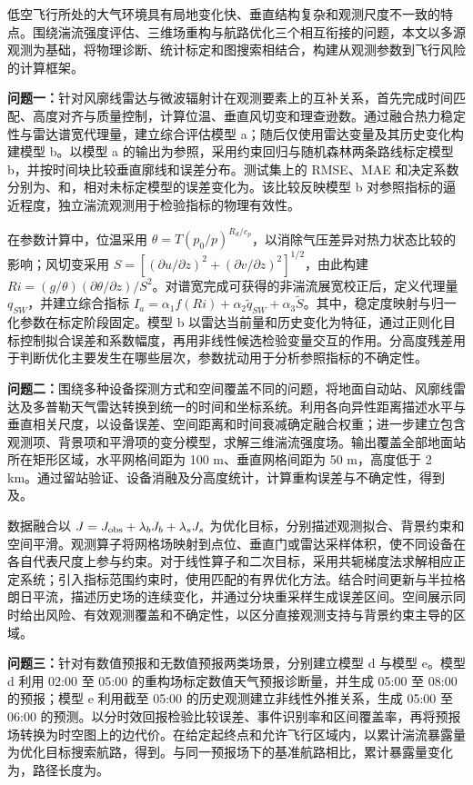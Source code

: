 \indent 低空飞行所处的大气环境具有局地变化快、垂直结构复杂和观测尺度不一致的特点。围绕湍流强度评估、三维场重构与航路优化三个相互衔接的问题，本文以多源观测为基础，将物理诊断、统计标定和图搜索相结合，构建从观测参数到飞行风险的计算框架。

\textbf{问题一：}针对风廓线雷达与微波辐射计在观测要素上的互补关系，首先完成时间匹配、高度对齐与质量控制，计算位温、垂直风切变和理查逊数。通过融合热力稳定性与雷达谱宽代理量，建立综合评估模型 a；随后仅使用雷达变量及其历史变化构建模型 b。以模型 a 的输出为参照，采用约束回归与随机森林两条路线标定模型 b，并按时间块比较垂直廓线和误差分布。测试集上的 RMSE、MAE 和决定系数分别为、和，相对未标定模型的误差变化为。该比较反映模型 b 对参照指标的逼近程度，独立湍流观测用于检验指标的物理有效性。

在参数计算中，位温采用 $\theta=T(p_0/p)^{R_d/c_p}$，以消除气压差异对热力状态比较的影响；风切变采用 $S=[(\partial u/\partial z)^2+(\partial v/\partial z)^2]^{1/2}$，由此构建 $Ri=(g/\theta)(\partial\theta/\partial z)/S^2$。对谱宽完成可获得的非湍流展宽校正后，定义代理量 $q_{SW}$，并建立综合指标 $I_a=\alpha_1f(Ri)+\alpha_2\widetilde q_{SW}+\alpha_3\widetilde S$。其中，稳定度映射与归一化参数在标定阶段固定。模型 b 以雷达当前量和历史变化为特征，通过正则化目标控制拟合误差和系数幅度，再用非线性候选检验变量交互的作用。分高度残差用于判断优化主要发生在哪些层次，参数扰动用于分析参照指标的不确定性。

\textbf{问题二：}围绕多种设备探测方式和空间覆盖不同的问题，将地面自动站、风廓线雷达及多普勒天气雷达转换到统一的时间和坐标系统。利用各向异性距离描述水平与垂直相关尺度，以设备误差、空间距离和时间衰减确定融合权重；进一步建立包含观测项、背景项和平滑项的变分模型，求解三维湍流强度场。输出覆盖全部地面站所在矩形区域，水平网格间距为 100 m、垂直网格间距为 50 m，高度低于 2 km。通过留站验证、设备消融及分高度统计，计算重构误差与不确定性，得到及。

数据融合以 $J=J_{\rm obs}+\lambda_bJ_b+\lambda_sJ_s$ 为优化目标，分别描述观测拟合、背景约束和空间平滑。观测算子将网格场映射到点位、垂直门或雷达采样体积，使不同设备在各自代表尺度上参与约束。对于线性算子和二次目标，采用共轭梯度法求解相应正定系统；引入指标范围约束时，使用匹配的有界优化方法。结合时间更新与半拉格朗日平流，描述历史场的连续变化，并通过分块重采样生成误差区间。空间展示同时给出风险、有效观测覆盖和不确定性，以区分直接观测支持与背景约束主导的区域。

\textbf{问题三：}针对有数值预报和无数值预报两类场景，分别建立模型 d 与模型 e。模型 d 利用 02:00 至 05:00 的重构场标定数值天气预报诊断量，并生成 05:00 至 08:00 的预报；模型 e 利用截至 05:00 的历史观测建立非线性外推关系，生成 05:00 至 06:00 的预测。以分时效回报检验比较误差、事件识别率和区间覆盖率，再将预报场转换为时空图上的边代价。在给定起终点和允许飞行区域内，以累计湍流暴露量为优化目标搜索航路，得到。与同一预报场下的基准航路相比，累计暴露量变化为，路径长度为。

